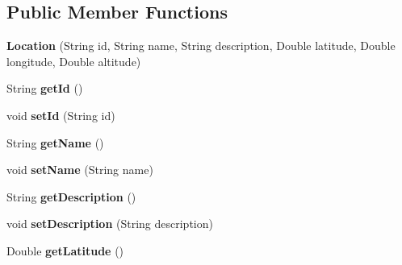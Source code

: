 \subsection*{Public Member Functions}
\begin{DoxyCompactItemize}
\item 
{\bfseries Location} (String id, String name, String description, Double latitude, Double longitude, Double altitude)\hypertarget{classeu_1_1h2020_1_1symbiote_1_1model_1_1Location_a4ea692dd0992307560ce06a254333d3f}{}\label{classeu_1_1h2020_1_1symbiote_1_1model_1_1Location_a4ea692dd0992307560ce06a254333d3f}

\item 
String {\bfseries get\+Id} ()\hypertarget{classeu_1_1h2020_1_1symbiote_1_1model_1_1Location_a98a3b93d177deb7b9630c5e37547d80d}{}\label{classeu_1_1h2020_1_1symbiote_1_1model_1_1Location_a98a3b93d177deb7b9630c5e37547d80d}

\item 
void {\bfseries set\+Id} (String id)\hypertarget{classeu_1_1h2020_1_1symbiote_1_1model_1_1Location_a308f71eeeed57f22b5996da217028d29}{}\label{classeu_1_1h2020_1_1symbiote_1_1model_1_1Location_a308f71eeeed57f22b5996da217028d29}

\item 
String {\bfseries get\+Name} ()\hypertarget{classeu_1_1h2020_1_1symbiote_1_1model_1_1Location_a78e563a2622952f37da6f571932afa23}{}\label{classeu_1_1h2020_1_1symbiote_1_1model_1_1Location_a78e563a2622952f37da6f571932afa23}

\item 
void {\bfseries set\+Name} (String name)\hypertarget{classeu_1_1h2020_1_1symbiote_1_1model_1_1Location_a67ddf61270deeb669ebcdce9b9ead998}{}\label{classeu_1_1h2020_1_1symbiote_1_1model_1_1Location_a67ddf61270deeb669ebcdce9b9ead998}

\item 
String {\bfseries get\+Description} ()\hypertarget{classeu_1_1h2020_1_1symbiote_1_1model_1_1Location_accf0bb0ab10306a962e09fc32c8d821c}{}\label{classeu_1_1h2020_1_1symbiote_1_1model_1_1Location_accf0bb0ab10306a962e09fc32c8d821c}

\item 
void {\bfseries set\+Description} (String description)\hypertarget{classeu_1_1h2020_1_1symbiote_1_1model_1_1Location_a45d3f8f4397791af93669578501a43bf}{}\label{classeu_1_1h2020_1_1symbiote_1_1model_1_1Location_a45d3f8f4397791af93669578501a43bf}

\item 
Double {\bfseries get\+Latitude} ()\hypertarget{classeu_1_1h2020_1_1symbiote_1_1model_1_1Location_af9bf675ed844e386162c04a3ebe18af8}{}\label{classeu_1_1h2020_1_1symbiote_1_1model_1_1Location_af9bf675ed844e386162c04a3ebe18af8}


\end{DoxyCompactItemize}
